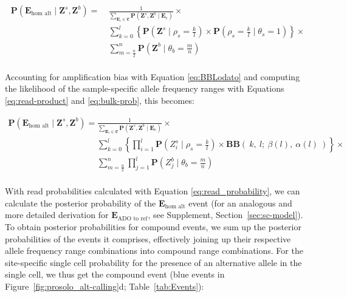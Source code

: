 \documentclass[12pt,inline]{wlscirep}
\newcommand{\Prob}{{\mathbf{P}}}
\newcommand{\cB}{{\mathbf{B}}}
\begin{document}
\begin{equation}
 \label{eq:hom-alt-posterior-likelihoods}
 \begin{split}   
 \Prob(\boldsymbol{E}_{\text{hom alt}} \mid \boldsymbol{Z}^s,\boldsymbol{Z}^b)
   =~&\frac{1}{\sum_{\boldsymbol{E}_e \in \mathfrak{E}}{\Prob(\boldsymbol{Z}^s,\boldsymbol{Z}^b \mid \boldsymbol{E}_e )}} \times \\
     &\sum_{k=0}^{l} \left\{ \Prob(\boldsymbol{Z}^s \mid \rho_s = \frac{k}{l}) \times \Prob(\rho_s = \frac{k}{l} \mid \theta_s =  1)\right\} \times \\
     &\sum_{m=\frac{n}{2}}^{n} \Prob(\boldsymbol{Z}^b \mid \theta_b = \frac{m}{n})\\
  \end{split}    
\end{equation}

Accounting for amplification bias with Equation \ref{eq:BBLodato} and computing the likelihood of the sample-specific allele frequency ranges with Equations \ref{eq:read-product} and \ref{eq:bulk-prob}, this becomes:

\begin{equation}
 \label{eq:hom-alt-posterior-reads}
 \begin{split}   
 \Prob(\boldsymbol{E}_{\text{hom alt}} \mid \boldsymbol{Z}^s,\boldsymbol{Z}^b)
   =~&\frac{1}{\sum_{\boldsymbol{E}_e \in \mathfrak{E}}{\Prob(\boldsymbol{Z}^s,\boldsymbol{Z}^b \mid \boldsymbol{E}_e )}} \times \\
      &\sum_{k=0}^{l} \left\{ \prod_{i=1}^l \Prob(Z_i^s \mid \rho_s = \frac{k}{l}) \times \cB\cB(~ k,~ l;~ \beta(l),~ \alpha(l)~ ) \right\} \times\\
      &\sum_{m=\frac{n}{2}}^{n} \prod_{j=1}^l \Prob\left(Z_j^b \mid \theta_b = \frac{m}{n} \right)\\
  \end{split}    
\end{equation}

With read probabilities calculated with Equation \ref{eq:read_probability}, we can calculate the posterior probability of the $\boldsymbol{E}_{\text{hom alt}}$ event (for an analogous and more detailed derivation for $\boldsymbol{E}_{\text{ADO to ref}}$, see Supplement, Section~\ref{sec:sc-model}).
To obtain posterior probabilities for compound events, we sum up the posterior probabilities of the events it comprises, effectively joining up their respective allele frequency range combinations into compound range combinations.
For the site-specific single cell probability for the presence of an alternative allele in the single cell, we thus get the compound event (blue events in Figure~\ref{fig:prosolo_alt-calling}d; Table~\ref{tab:Events}):
\end{document}
